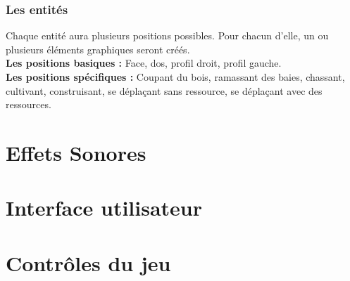 \documentclass[a4paper]{article}
\begin{document}
    \section{Les entités}
      Chaque entité aura plusieurs positions possibles. Pour chacun d'elle, un ou plusieurs éléments graphiques seront créés.\\
      \textbf{Les positions basiques :}\small{ Face, dos, profil droit, profil gauche.}\\
      \textbf{Les positions spécifiques :}\small{ Coupant du bois, ramassant des baies, chassant, cultivant, construisant, se déplaçant sans ressource, se déplaçant avec des ressources.}
  
  
  \part{Effets Sonores}
  
  
  \part{Interface utilisateur}
  
  
  \part{Contrôles du jeu}
  
  
\end{document}
